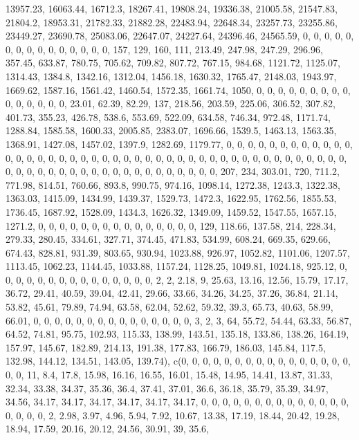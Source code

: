 \documentclass[
]{article}
\begin{document}
13957.23, 16063.44, 16712.3, 18267.41, 19808.24, 19336.38, 21005.58,
21547.83, 21804.2, 18953.31, 21782.33, 21882.28, 22483.94, 22648.34,
23257.73, 23255.86, 23449.27, 23690.78, 25083.06, 22647.07, 24227.64,
24396.46, 24565.59, 0, 0, 0, 0, 0, 0, 0, 0, 0, 0, 0, 0, 0, 0, 0, 157,
129, 160, 111, 213.49, 247.98, 247.29, 296.96, 357.45, 633.87, 780.75,
705.62, 709.82, 807.72, 767.15, 984.68, 1121.72, 1125.07, 1314.43,
1384.8, 1342.16, 1312.04, 1456.18, 1630.32, 1765.47, 2148.03, 1943.97,
1669.62, 1587.16, 1561.42, 1460.54, 1572.35, 1661.74, 1050, 0, 0, 0, 0,
0, 0, 0, 0, 0, 0, 0, 0, 0, 0, 0, 23.01, 62.39, 82.29, 137, 218.56,
203.59, 225.06, 306.52, 307.82, 401.73, 355.23, 426.78, 538.6, 553.69,
522.09, 634.58, 746.34, 972.48, 1171.74, 1288.84, 1585.58, 1600.33,
2005.85, 2383.07, 1696.66, 1539.5, 1463.13, 1563.35, 1368.91, 1427.08,
1457.02, 1397.9, 1282.69, 1179.77, 0, 0, 0, 0, 0, 0, 0, 0, 0, 0, 0, 0,
0, 0, 0, 0, 0, 0, 0, 0, 0, 0, 0, 0, 0, 0, 0, 0, 0, 0, 0, 0, 0, 0, 0, 0,
0, 0, 0, 0, 0, 0, 0, 0, 0, 0, 0, 0, 0, 0, 0, 0, 0, 0, 0, 0, 0, 0, 0, 0,
0, 0, 0, 0, 207, 234, 303.01, 720, 711.2, 771.98, 814.51, 760.66, 893.8,
990.75, 974.16, 1098.14, 1272.38, 1243.3, 1322.38, 1363.03, 1415.09,
1434.99, 1439.37, 1529.73, 1472.3, 1622.95, 1762.56, 1855.53, 1736.45,
1687.92, 1528.09, 1434.3, 1626.32, 1349.09, 1459.52, 1547.55, 1657.15,
1271.2, 0, 0, 0, 0, 0, 0, 0, 0, 0, 0, 0, 0, 0, 0, 0, 129, 118.66,
137.58, 214, 228.34, 279.33, 280.45, 334.61, 327.71, 374.45, 471.83,
534.99, 608.24, 669.35, 629.66, 674.43, 828.81, 931.39, 803.65, 930.94,
1023.88, 926.97, 1052.82, 1101.06, 1207.57, 1113.45, 1062.23, 1144.45,
1033.88, 1157.24, 1128.25, 1049.81, 1024.18, 925.12, 0, 0, 0, 0, 0, 0,
0, 0, 0, 0, 0, 0, 0, 0, 0, 2, 2, 2.18, 9, 25.63, 13.16, 12.56, 15.79,
17.17, 36.72, 29.41, 40.59, 39.04, 42.41, 29.66, 33.66, 34.26, 34.25,
37.26, 36.84, 21.14, 53.82, 45.61, 79.89, 74.94, 63.58, 62.04, 52.62,
59.32, 39.3, 65.73, 40.63, 58.99, 66.01, 0, 0, 0, 0, 0, 0, 0, 0, 0, 0,
0, 0, 0, 0, 0, 3, 2, 3, 64, 55.72, 54.44, 63.33, 56.87, 64.52, 74.81,
95.75, 102.93, 115.33, 138.99, 143.51, 135.18, 133.86, 138.26, 164.19,
157.97, 145.67, 182.89, 214.13, 191.38, 177.83, 166.79, 186.03, 145.84,
117.5, 132.98, 144.12, 134.51, 143.05, 139.74), c(0, 0, 0, 0, 0, 0, 0,
0, 0, 0, 0, 0, 0, 0, 0, 0, 0, 0, 11, 8.4, 17.8, 15.98, 16.16, 16.55,
16.01, 15.48, 14.95, 14.41, 13.87, 31.33, 32.34, 33.38, 34.37, 35.36,
36.4, 37.41, 37.01, 36.6, 36.18, 35.79, 35.39, 34.97, 34.56, 34.17,
34.17, 34.17, 34.17, 34.17, 34.17, 0, 0, 0, 0, 0, 0, 0, 0, 0, 0, 0, 0,
0, 0, 0, 0, 0, 0, 2, 2.98, 3.97, 4.96, 5.94, 7.92, 10.67, 13.38, 17.19,
18.44, 20.42, 19.28, 18.94, 17.59, 20.16, 20.12, 24.56, 30.91, 39, 35.6,
\end{document}
